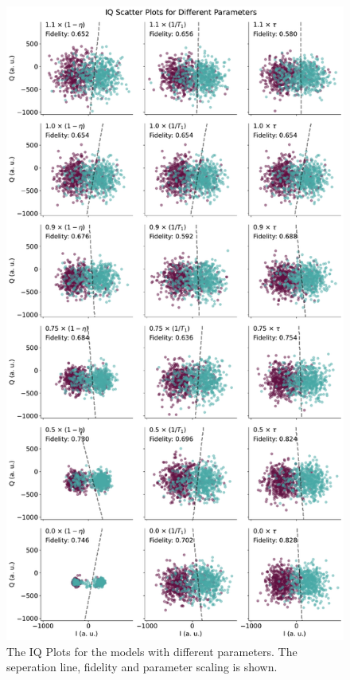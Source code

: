 \begin{figure}
    \centering
    \includegraphics{Simulations/budgets/figures/iq_scatter_budgetting.pdf}
    \caption{The IQ Plots for the models  with different parameters. The seperation line, fidelity and parameter scaling is shown.}
    \label{fig:budgetting_IQ_plots}
\end{figure}

